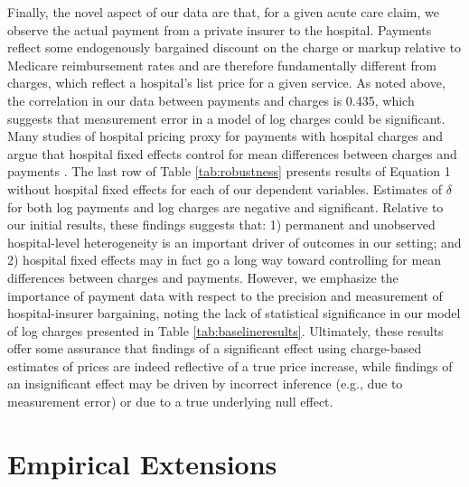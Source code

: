 \documentclass[12pt]{article}
\begin{document}
Finally, the novel aspect of our data are that, for a given acute care claim, we observe the actual payment from a private insurer to the hospital. Payments reflect some endogenously bargained discount on the charge or markup relative to Medicare reimbursement rates and are therefore fundamentally different from charges, which reflect a hospital's list price for a given service. As noted above, the correlation in our data between payments and charges is 0.435, which suggests that measurement error in a model of log charges could be significant. Many studies of hospital pricing proxy for payments with hospital charges and argue that hospital fixed effects control for mean differences between charges and payments \citep{cutler2000}. The last row of Table \ref{tab:robustness} presents results of Equation 1 without hospital fixed effects for each of our dependent variables.  Estimates of $\delta$ for both log payments and log charges are negative and significant. Relative to our initial results, these findings suggests that: 1) permanent and unobserved hospital-level heterogeneity is an important driver of outcomes in our setting; and 2) hospital fixed effects may in fact go a long way toward controlling for mean differences between charges and payments. However, we emphasize the importance of payment data with respect to the precision and measurement of hospital-insurer bargaining, noting the lack of statistical significance in our model of log charges presented in Table \ref{tab:baselineresults}. Ultimately, these results offer some assurance that findings of a significant effect using charge-based estimates of prices are indeed reflective of a true price increase, while findings of an insignificant effect may be driven by incorrect inference (e.g., due to measurement error) or due to a true underlying null effect.

\section{Empirical Extensions}
\label{sec:Ext}
\end{document}
